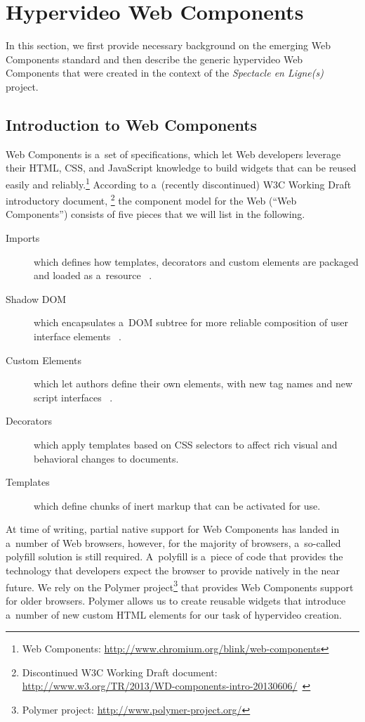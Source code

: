 \documentclass[runningheads,a4paper]{llncs}
\begin{document}
\section{Hypervideo Web Components}
\label{sec:hypervideo-web-components}

In this section, we first provide necessary background on the emerging Web Components standard
and then describe the generic hypervideo Web Components
that were created in the context of the \emph{Spectacle en Ligne(s)} project.

\subsection{Introduction to Web Components}

Web Components is a~set of specifications, which let Web developers leverage
their HTML, CSS, and JavaScript knowledge to build widgets
that can be reused easily and reliably.\footnote{Web Components:
\url{http://www.chromium.org/blink/web-components}}
According to a~(recently discontinued) W3C Working Draft introductory document,%
\footnote{Discontinued W3C Working Draft document:
\url{http://www.w3.org/TR/2013/WD-components-intro-20130606/}~\cite{cooney2013webcomponents}}
the component model for the Web (``Web Components'') consists of five pieces
that we will list in the following.

\begin{description}
  \item[Imports] which defines how templates, decorators and custom elements are packaged and loaded as a~resource%
  ~\cite{glazkov2014htmlimports}.
  \item[Shadow DOM] which encapsulates a~DOM subtree for more reliable composition of user interface elements%
  ~\cite{glazkov2014shadowdom}.    
  \item[Custom Elements] which let authors define their own elements, with new tag names and new script interfaces%
  ~\cite{glazkov2013customelements}.  
  \item[Decorators] which apply templates based on CSS selectors to affect rich visual and behavioral changes to documents.
  \item[Templates] which define chunks of inert markup that can be activated for use.  
\end{description}

\noindent At time of writing, partial native support for Web Components
has landed in a~number of Web browsers,
however, for the majority of browsers,
a~so-called polyfill solution is still required.
A~polyfill  is a~piece of code that provides the technology
that developers expect the browser to provide natively in the near future.
We rely on the Polymer project\footnote{Polymer project:
\url{http://www.polymer-project.org/}}
that provides Web Components support for older browsers.
Polymer allows us to create reusable widgets that introduce a~number of new
custom HTML elements for our task of hypervideo creation.
\end{document}
